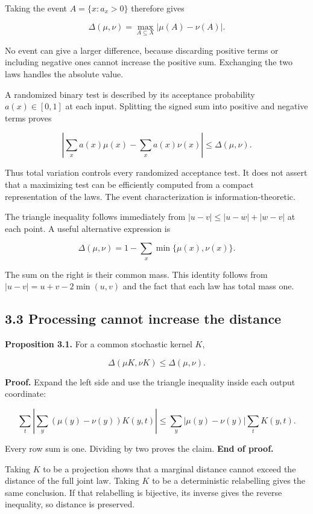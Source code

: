 \documentclass[
]{article}
\begin{document}
Taking the event \(A=\{x:a_x>0\}\) therefore gives

\[
\Delta(\mu,\nu)=\max_{A\subseteq X}|\mu(A)-\nu(A)|.
\]

No event can give a larger difference, because discarding positive terms
or including negative ones cannot increase the positive sum. Exchanging
the two laws handles the absolute value.

A randomized binary test is described by its acceptance probability
\(a(x)\in[0,1]\) at each input. Splitting the signed sum into positive
and negative terms proves

\[
\left|\sum_xa(x)\mu(x)-\sum_xa(x)\nu(x)\right|
\le\Delta(\mu,\nu).
\]

Thus total variation controls every randomized acceptance test. It does
not assert that a maximizing test can be efficiently computed from a
compact representation of the laws. The event characterization is
information-theoretic.

The triangle inequality follows immediately from \(|u-v|\le|u-w|+|w-v|\)
at each point. A useful alternative expression is

\[
\Delta(\mu,\nu)=1-\sum_x\min\{\mu(x),\nu(x)\}.
\]

The sum on the right is their common mass. This identity follows from
\(|u-v|=u+v-2\min(u,v)\) and the fact that each law has total mass one.

\subsection{3.3 Processing cannot increase the
distance}\label{processing-cannot-increase-the-distance}

\textbf{Proposition 3.1.} For a common stochastic kernel \(K\),

\[
\Delta(\mu K,\nu K)\le\Delta(\mu,\nu).
\]

\textbf{Proof.} Expand the left side and use the triangle inequality
inside each output coordinate:

\[
\sum_t\left|\sum_y(\mu(y)-\nu(y))K(y,t)\right|
\le\sum_y|\mu(y)-\nu(y)|\sum_tK(y,t).
\]

Every row sum is one. Dividing by two proves the claim. \textbf{End of
proof.}

Taking \(K\) to be a projection shows that a marginal distance cannot
exceed the distance of the full joint law. Taking \(K\) to be a
deterministic relabelling gives the same conclusion. If that relabelling
is bijective, its inverse gives the reverse inequality, so distance is
preserved.
\end{document}
